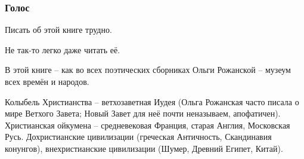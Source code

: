 \documentclass[12pt,a5paper,twoside]{article}
\begin{document}
\setcounter{page}{5}





%








\begin{center}
\subsubsection*{Голос}
\end{center}

Писать об этой книге трудно.

Не так-то легко даже читать её.

В этой книге -- как во всех поэтических сборниках Ольги Рожанской -- музеум всех времён и народов.

Колыбель Христианства -- ветхозаветная Иудея (Ольга Рожанская часто писала о мире Ветхого Завета; 
Новый Завет для неё почти неназываем, апофатичен). Христианская ойкумена -- средневековая Франция, 
старая Англия, Московская Русь. Дохристианские цивилизации 
(греческая Античность, Скандинавия конунгов), внехристианские цивилизации 
(Шумер, Древний Египет, Китай).
\end{document}
